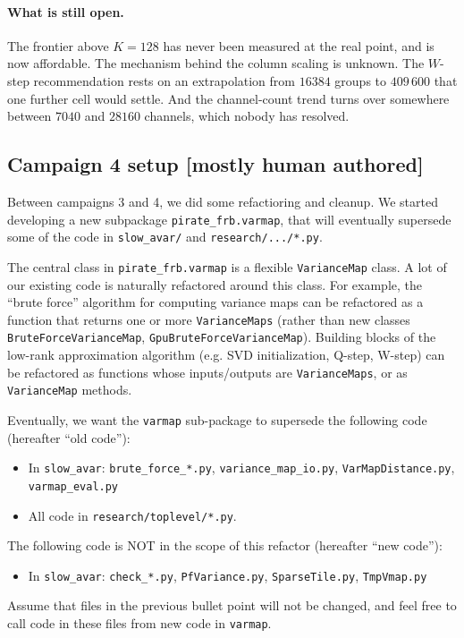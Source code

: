 \documentclass{article}
\numberwithin{equation}{section}   %
\begin{document}
\paragraph{What is still open.}
The frontier above $K = 128$ has never been measured at the real point, and is now affordable.
The mechanism behind the column scaling is unknown. The $W$-step recommendation rests on an
extrapolation from $16384$ groups to $409\,600$ that one further cell would settle. And the
channel-count trend turns over somewhere between $7040$ and $28160$ channels, which nobody has
resolved.

\subsection{Campaign 4 setup [mostly human authored]}
\label{ssec:campaign4_setup}

Between campaigns 3 and 4, we did some refactioring and cleanup.
We started developing a new subpackage \verb|pirate_frb.varmap|,
that will eventually supersede some of the code in \verb|slow_avar/| and \verb|research/.../*.py|.

The central class in \verb|pirate_frb.varmap| is a flexible \verb|VarianceMap| class. 
A lot of our existing code is naturally refactored around this class. For example, 
the ``brute force'' algorithm for computing variance maps can be refactored as a 
function that returns one or more \verb|VarianceMaps| (rather than new classes
\verb|BruteForceVarianceMap|, \verb|GpuBruteForceVarianceMap|). Building blocks 
of the low-rank approximation algorithm (e.g. SVD initialization, Q-step, W-step) 
can be refactored as functions whose inputs/outputs are \verb|VarianceMaps|, 
or as \verb|VarianceMap| methods.

Eventually, we want the \verb|varmap| sub-package to supersede the following code
(hereafter ``old code''):
\begin{itemize}
\item In \verb|slow_avar|: \verb|brute_force_*.py|, \verb|variance_map_io.py|,
 \verb|VarMapDistance.py|, \verb|varmap_eval.py|
\item All code in \verb|research/toplevel/*.py|.
\end{itemize}
The following code is NOT in the scope of this refactor (hereafter ``new code''):
\begin{itemize}
\item In \verb|slow_avar|: \verb|check_*.py|, \verb|PfVariance.py|, \verb|SparseTile.py|,
 \verb|TmpVmap.py|
\end{itemize}
Assume that files in the previous bullet point will not be changed, and feel free to
call code in these files from new code in \verb|varmap|.
\end{document}
